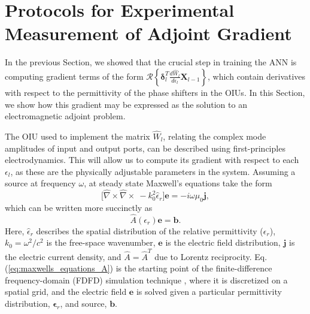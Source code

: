 \section{Protocols for Experimental Measurement of Adjoint Gradient}

In the previous Section, we showed that the crucial step in training the ANN is computing gradient terms of the form  $\mathcal{R}\left\{\boldsymbol{\delta}_l^T \frac{d \hat{W}_l}{d\epsilon_l} \mathbf{X}_{l-1}\right\}$, which contain derivatives with respect to the permittivity of the phase shifters in the OIUs. In this Section, we show how this gradient may be expressed as the solution to an electromagnetic adjoint problem.

The OIU used to implement the matrix $\hat{W}_l$, relating the complex mode amplitudes of input and output ports, can be described using first-principles electrodynamics.  This will allow us to compute its gradient with respect to each $\epsilon_l$, as these are the physically adjustable parameters in the system. Assuming a source at frequency $\omega$, at steady state Maxwell's equations take the form 
\begin{equation}
\Big[ \hat{\nabla} \times \hat{\nabla} \times ~ -k_0^2 \hat{\epsilon}_r \Big]\mathbf{e} = -i\omega \mu_0 \mathbf{j},
\label{eq:maxwells_equations_physics}
\end{equation}
which can be written more succinctly as
\begin{equation}
\hat{A}(\epsilon_r) \mathbf{e} = \mathbf{b}
\label{eq:maxwells_equations_A}.
\end{equation}
Here, $\hat{\epsilon}_r$ describes the spatial distribution of the relative permittivity ($\epsilon_r$), $k_0=\omega^2/c^2$ is the free-space wavenumber, $\mathbf{e}$ is the electric field distribution, $\mathbf{j}$ is the electric current density, and $\hat{A} = \hat{A}^T$ due to Lorentz reciprocity. Eq. (\ref{eq:maxwells_equations_A}) is the starting point of the finite-difference frequency-domain (FDFD) simulation technique \cite{shin2012choice}, where it is discretized on a spatial grid, and the electric field $\mathbf{e}$ is solved given a particular permittivity distribution, $\boldsymbol{\epsilon}_r$, and source, $\mathbf{b}$.

